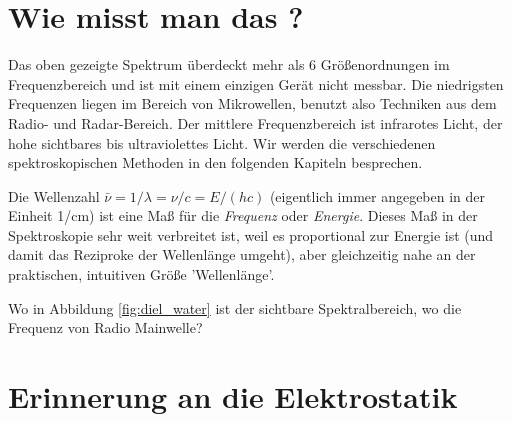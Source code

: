 \section{Wie misst man das ?}

Das oben gezeigte Spektrum überdeckt mehr als 6 Größenordnungen im Frequenzbereich und ist mit einem einzigen Gerät nicht  messbar. Die niedrigsten Frequenzen liegen im Bereich von Mikrowellen, benutzt also Techniken aus dem Radio- und Radar-Bereich. Der mittlere Frequenzbereich ist infrarotes Licht, der hohe sichtbares bis ultraviolettes Licht. Wir werden die verschiedenen spektroskopischen Methoden in den folgenden Kapiteln besprechen.


Die Wellenzahl $\bar{\nu} = 1 / \lambda =\nu / c =  E / (h c)$ (eigentlich immer angegeben in der Einheit 1/cm) ist eine Maß für die  \emph{Frequenz} oder \emph{Energie}. Dieses Maß in der Spektroskopie sehr weit verbreitet ist, weil es proportional zur Energie ist (und damit das Reziproke der Wellenlänge umgeht), aber gleichzeitig nahe an der praktischen, intuitiven Größe 'Wellenlänge'.



\begin{questions} 
\item Wo in  Abbildung  \ref{fig:diel_water} ist der sichtbare Spektralbereich, wo die Frequenz von Radio Mainwelle?
\end{questions}


\section{Erinnerung an die Elektrostatik }

